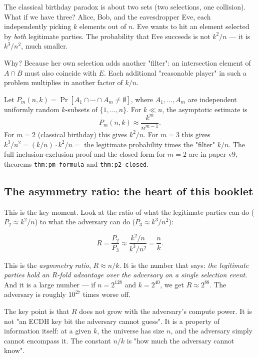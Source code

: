 \documentclass[11pt,a4paper]{article}
\begin{document}
The classical birthday paradox is about two sets (two selections, one collision). What if we have three? Alice, Bob, and the eavesdropper Eve, each independently picking $k$ elements out of $n$. Eve wants to hit an element selected by \emph{both} legitimate parties. The probability that Eve succeeds is not $k^2/n$ --- it is $k^3 / n^2$, much smaller.

Why? Because her own selection adds another "filter": an intersection element of $A \cap B$ must also coincide with $E$. Each additional "reasonable player" in such a problem multiplies in another factor of $k/n$.

\begin{sidebar}
Let $P_m(n, k) = \Pr[A_1 \cap \cdots \cap A_m \neq \emptyset]$, where $A_1, \ldots, A_m$ are independent uniformly random $k$-subsets of $\{1, \ldots, n\}$. For $k \ll n$, the asymptotic estimate is
\[
P_m(n, k) \approx \frac{k^m}{n^{m-1}}.
\]
For $m = 2$ (classical birthday) this gives $k^2/n$. For $m = 3$ this gives $k^3/n^2 = (k/n) \cdot k^2/n = $ the legitimate probability times the "filter" $k/n$. The full inclusion-exclusion proof and the closed form for $m=2$ are in paper v9, theorems \texttt{thm:pm-formula} and \texttt{thm:p2-closed}.
\end{sidebar}

\subsection{The asymmetry ratio: the heart of this booklet}

This is the key moment. Look at the ratio of what the legitimate parties can do ($P_2 \approx k^2/n$) to what the adversary can do ($P_3 \approx k^3/n^2$):

\[
R = \frac{P_2}{P_3} \approx \frac{k^2 / n}{k^3 / n^2} = \frac{n}{k}.
\]

This is the \emph{asymmetry ratio}, $R \approx n/k$. It is the number that says: \emph{the legitimate parties hold an $R$-fold advantage over the adversary on a single selection event}. And it is a large number --- if $n = 2^{128}$ and $k = 2^{40}$, we get $R \approx 2^{88}$. The adversary is roughly $10^{27}$ times worse off.

\begin{aha}
The key point is that $R$ does not grow with the adversary's compute power. It is not "an ECDH key bit the adversary cannot guess". It is a property of information itself: at a given $k$, the universe has size $n$, and the adversary simply cannot encompass it. The constant $n/k$ is "how much the adversary cannot know".
\end{aha}
\end{document}

